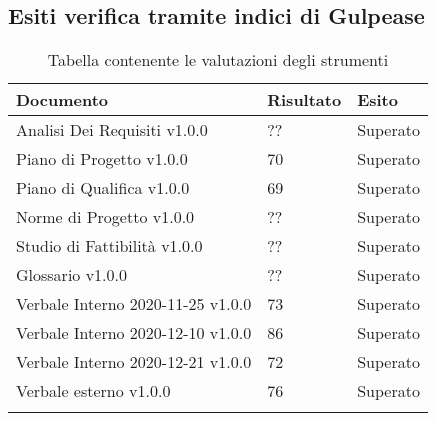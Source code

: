 \documentclass[../piano_di_qualifica.tex]{subfiles}
\begin{document}
\subsection{Esiti verifica tramite indici di Gulpease}
\label{sub:verif_gul}

\begin{center}
	\begin{longtable}{|p{4.5cm}|p{2.5cm}|p{3cm}|}
		\hline
		\rowcolor{lightgray}
            \textbf{Documento} & \textbf{Risultato} &  \textbf{Esito} \\
            \hline 
            Analisi Dei Requisiti v1.0.0 & ?? & Superato \\
            \hline
            \hline 
            Piano di Progetto v1.0.0 & 70 & Superato \\
            \hline 
            Piano di Qualifica v1.0.0 & 69 & Superato \\
            \hline 
            Norme di Progetto v1.0.0 & ?? & Superato \\
            \hline 
            Studio di Fattibilità v1.0.0 & ?? & Superato \\
            \hline 
            Glossario v1.0.0 & ?? & Superato \\
            \hline 
            Verbale Interno 2020-11-25 v1.0.0 & 73 & Superato \\
            \hline 
            Verbale Interno 2020-12-10 v1.0.0 & 86 & Superato \\
            \hline 
            Verbale Interno 2020-12-21 v1.0.0 & 72 & Superato \\
            \hline 
            Verbale esterno v1.0.0 & 76 & Superato \\
            \hline
            \hline

\caption{Tabella contenente le valutazioni degli strumenti}
\end{longtable}
\end{center}
\end{document}
